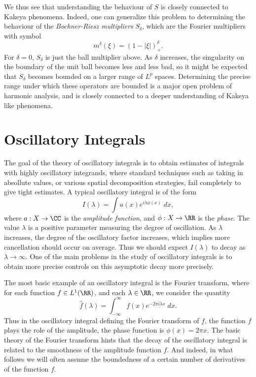 We thus see that understanding the behaviour of $S$ is closely connected to Kakeya phenomena. Indeed, one can generalize this problem to determining the behaviour of the \emph{Bochner-Riesz multipliers} $S_\delta$, which are the Fourier multipliers with symbol
%
\[ m^\delta(\xi) = (1 - |\xi|)_+^\delta. \]
%
For $\delta = 0$, $S_\delta$ is just the ball multiplier above. As $\delta$ increases, the singularity on the boundary of the unit ball becomes less and less bad, so it might be expected that $S_\delta$ becomes bounded on a larger range of $L^p$ spaces. Determining the precise range under which these operators are bounded is a major open problem of harmonic analysis, and is closely connected to a deeper understanding of Kakeya like phenomena.








\chapter{Oscillatory Integrals}

The goal of the theory of oscillatory integrals is to obtain estimates of integrals with highly oscillatory integrands, where standard techniques such as taking in absollute values, or various spatial decomposition strategies, fail completely to give tight estimates. A typical oscillatory integral is of the form
%
\[ I(\lambda) = \int a(x) e^{i \lambda \phi(x)}\; dx, \]
%
where $a: X \to \CC$ is the \emph{amplitude function}, and $\phi: X \to \RR$ is the \emph{phase}. The value $\lambda$ is a positive parameter measuring the degree of oscillation. As $\lambda$ increases, the degree of the oscillatory factor increases, which implies more cancellation should occur on average. Thus we should expect $I(\lambda)$ to decay as $\lambda \to \infty$. One of the main problems in the study of oscillatory integrals is to obtain more precise controls on this asymptotic decay more precisely.

\begin{example}
    The most basic example of an oscillatory integral is the Fourier transform, where for each function $f \in L^1(\RR)$, and each $\lambda \in \RR$, we consider the quantity
    \[ \widehat{f}(\lambda) = \int_{-\infty}^\infty f(x) e^{- 2 \pi i \lambda x}\; dx. \]
    Thus in the oscillatory integral defining the Fourier transform of $f$, the function $f$ plays the role of the amplitude, the phase function is $\phi(x) = 2 \pi x$. The basic theory of the Fourier transform hints that the decay of the oscillatory integral is related to the smoothness of the amplitude function $f$. And indeed, in what follows we will often assume the boundedness of a certain number of derivatives of the function $f$.
\end{example}

